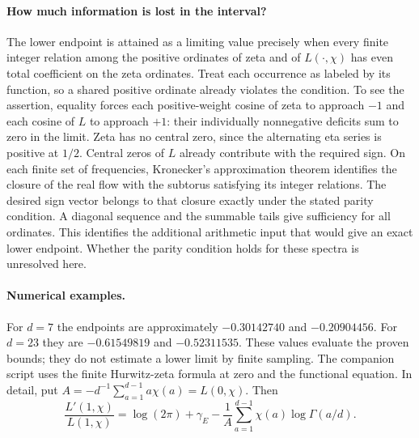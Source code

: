 \paragraph{How much information is lost in the interval?}
The lower endpoint is attained as a limiting value precisely when every
finite integer relation among the positive ordinates of zeta and of
$L(\cdot,\chi)$ has even total coefficient on the zeta ordinates.
Treat each occurrence as labeled by its function, so a shared positive
ordinate already violates the condition. To see the assertion, equality
forces each positive-weight cosine of zeta to approach $-1$ and each
cosine of $L$ to approach $+1$: their individually nonnegative deficits
sum to zero in the limit. Zeta has no central zero, since the alternating
eta series is positive at $1/2$. Central zeros of $L$ already contribute
with the required sign. On each finite set of frequencies, Kronecker's
approximation theorem identifies the closure of the real flow with the
subtorus satisfying its integer relations. The desired sign vector
belongs to that closure exactly under the stated parity condition.
A diagonal sequence and the summable tails give sufficiency for all
ordinates. This identifies the additional arithmetic input that would
give an exact lower endpoint. Whether the parity condition holds for
these spectra is unresolved here.

\paragraph{Numerical examples.}
For $d=7$ the endpoints are approximately $-0.30142740$ and
$-0.20904456$. For $d=23$ they are $-0.61549819$ and $-0.52311535$.
These values evaluate the proven bounds; they do not estimate a lower
limit by finite sampling. The companion script uses the finite
Hurwitz-zeta formula at zero and the functional equation. In detail, put
$A=-d^{-1}\sum_{a=1}^{d-1}a\chi(a)=L(0,\chi)$. Then
\[
 \frac{L'(1,\chi)}{L(1,\chi)}
 =\log(2\pi)+\gamma_E
  -\frac{1}{A}\sum_{a=1}^{d-1}\chi(a)\log\Gamma(a/d).
\]

